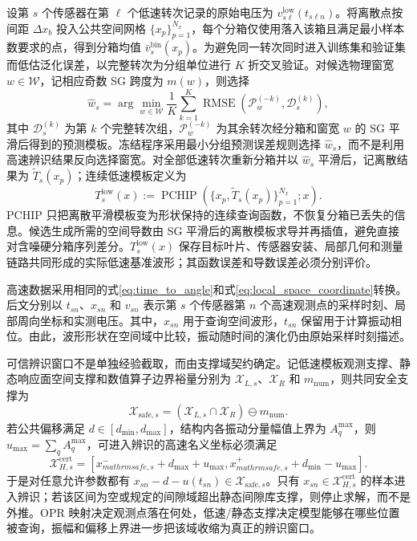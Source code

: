 \documentclass[UTF8,12pt,a4paper]{ctexart}
\begin{document}
设第 $s$ 个传感器在第 $\ell$ 个低速转次记录的原始电压为 $v_{s\ell}^{\mathrm{low}}(t_{s\ell n})$。将离散点按间距 $\Delta x_b$ 投入公共空间网格 $\{x_p\}_{p=1}^{N_x}$，每个分箱仅使用落入该箱且满足最小样本数要求的点，得到分箱均值 $\bar v_{s}^{\mathrm{bin}}(x_p)$。为避免同一转次同时进入训练集和验证集而低估泛化误差，以完整转次为分组单位进行 $K$ 折交叉验证。对候选物理窗宽 $w\in\mathcal W$，记相应奇数 SG 跨度为 $m(w)$，则选择
\begin{equation}
\widehat w_s
=\arg\min_{w\in\mathcal W}
\frac{1}{K}\sum_{k=1}^{K}
\operatorname{RMSE}\!\left(
\mathcal P_{w}^{(-k)},\mathcal D_{s}^{(k)}
\right),
\label{eq:spatial_resampling}
\end{equation}
其中 $\mathcal D_s^{(k)}$ 为第 $k$ 个完整转次组，$\mathcal P_w^{(-k)}$ 为其余转次经分箱和窗宽 $w$ 的 SG 平滑后得到的预测模板。冻结程序采用最小分组预测误差规则选择 $\widehat w_s$，而不是利用高速辨识结果反向选择窗宽。对全部低速转次重新分箱并以 $\widehat w_s$ 平滑后，记离散结果为 $\widetilde T_s(x_p)$；连续低速模板定义为
\begin{equation}
T_s^{\mathrm{low}}(x)
:=\operatorname{PCHIP}\!\left(\{x_p,\widetilde T_s(x_p)\}_{p=1}^{N_x};x\right).
\label{eq:low_template}
\end{equation}
PCHIP 只把离散平滑模板变为形状保持的连续查询函数，不恢复分箱已丢失的信息。候选生成所需的空间导数由 SG 平滑后的离散模板求导并再插值，避免直接对含噪硬分箱序列差分。$T_s^{\mathrm{low}}(x)$ 保存目标叶片、传感器安装、局部几何和测量链路共同形成的实际低速基准波形；其函数误差和导数误差必须分别评价。

高速数据采用相同的式\eqref{eq:time_to_angle}和式\eqref{eq:local_space_coordinate}转换。后文分别以 $t_{sn}$、$x_{sn}$ 和 $v_{sn}$ 表示第 $s$ 个传感器第 $n$ 个高速观测点的采样时刻、局部周向坐标和实测电压。其中，$x_{sn}$ 用于查询空间波形，$t_{sn}$ 保留用于计算振动相位。由此，波形形状在空间域中比较，振动随时间的演化仍由原始采样时刻描述。

可信辨识窗口不是单独经验截取，而由支撑域契约确定。记低速模板观测支撑、静态响应面空间支撑和数值算子边界裕量分别为 $\mathcal X_{L,s}$、$\mathcal X_R$ 和 $m_{\mathrm{num}}$，则共同安全支撑为
\begin{equation}
\mathcal X_{\mathrm{safe},s}
=\left(\mathcal X_{L,s}\cap\mathcal X_R\right)\ominus m_{\mathrm{num}}.
\label{eq:safe_support}
\end{equation}
若公共偏移满足 $d\in[d_{\min},d_{\max}]$，结构内各振动分量幅值上界为 $A_q^{\max}$，则 $u_{\max}=\sum_q A_q^{\max}$，可进入辨识的高速名义坐标必须满足
\begin{equation}
\mathcal X_{H,s}^{\mathrm{cert}}
=\left[
x_{mathrm{safe},s}^{-}+d_{\max}+u_{\max},
x_{mathrm{safe},s}^{+}+d_{\min}-u_{\max}
\right].
\label{eq:certified_high_support}
\end{equation}
于是对任意允许参数都有 $x_{sn}-d-u(t_{sn})\in\mathcal X_{\mathrm{safe},s}$。只有 $x_{sn}\in\mathcal X_{H,s}^{\mathrm{cert}}$ 的样本进入辨识；若该区间为空或规定的间隙域超出静态间隙库支撑，则停止求解，而不是外推。OPR 映射决定观测点落在何处，低速/静态支撑决定模型能够在哪些位置被查询，振幅和偏移上界进一步把该域收缩为真正的辨识窗口。
\end{document}
